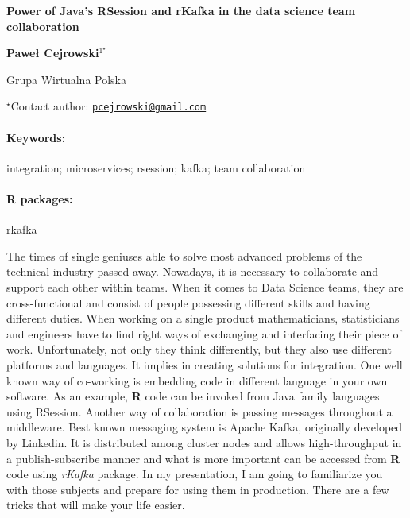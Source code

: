 \documentclass[11pt, a4paper]{article}
\renewcommand{\title}[1]{\begin{center}{\bf \LARGE #1}\end{center}}
\newcommand{\keywords}{\paragraph{Keywords:}}
\newcommand{\packages}{\paragraph{R packages:}}
\begin{document}
\pagestyle{empty}

\title{Power of Java's RSession and rKafka in the data science team
collaboration}

\begin{center}
  {\bf Paweł Cejrowski$^{1^\star}$}
\end{center}

\vskip 0.3cm

\begin{affiliations}
\begin{enumerate}
\begin{minipage}{0.915\textwidth}
\centering
\item Grupa Wirtualna Polska \\[-2pt]
\end{minipage}
\end{enumerate}
$^\star$Contact author: \href{mailto:pcejrowski@gmail.com}{\nolinkurl{pcejrowski@gmail.com}}\\
\end{affiliations}

\vskip 0.5cm

\begin{minipage}{0.915\textwidth}
\keywords integration; microservices; rsession; kafka; team collaboration
\packages rkafka
\end{minipage}

\vskip 0.8cm

The times of single geniuses able to solve most advanced problems of the
technical industry passed away. Nowadays, it is necessary to collaborate
and support each other within teams. When it comes to Data Science
teams, they are cross-functional and consist of people possessing
different skills and having different duties. When working on a single
product mathematicians, statisticians and engineers have to find right
ways of exchanging and interfacing their piece of work. Unfortunately,
not only they think differently, but they also use different platforms
and languages. It implies in creating solutions for integration. One
well known way of co-working is embedding code in different language in
your own software. As an example, \textbf{R} code can be invoked from
Java family languages using RSession. Another way of collaboration is
passing messages throughout a middleware. Best known messaging system is
Apache Kafka, originally developed by Linkedin. It is distributed among
cluster nodes and allows high-throughput in a publish-subscribe manner
and what is more important can be accessed from \textbf{R} code using
\emph{rKafka} package. In my presentation, I am going to familiarize you
with those subjects and prepare for using them in production. There are
a few tricks that will make your life easier.
\end{document}
